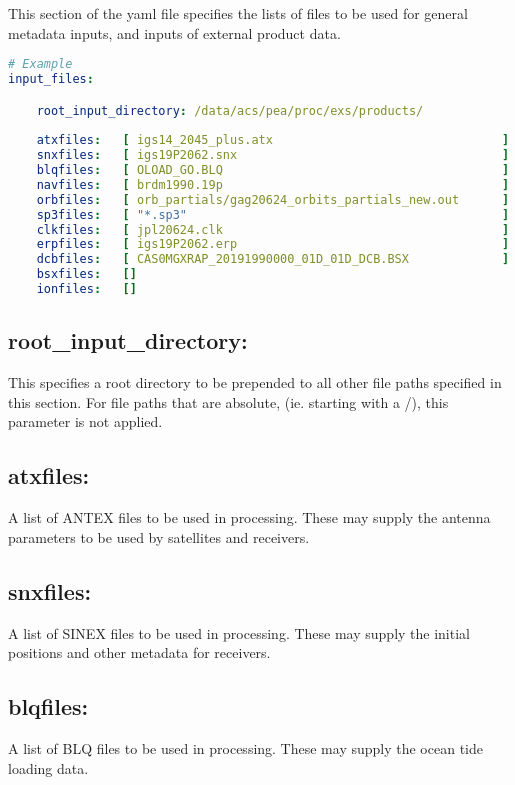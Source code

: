 This section of the yaml file specifies the lists of files to be used for general metadata inputs, and inputs of external product data.

\begin{lstlisting}[language=yaml,caption=A typical input\_files section]
# Example
input_files:

	root_input_directory: /data/acs/pea/proc/exs/products/
	
	atxfiles:   [ igs14_2045_plus.atx                                ]
	snxfiles:   [ igs19P2062.snx                                     ]
	blqfiles:   [ OLOAD_GO.BLQ                                       ]  
	navfiles:   [ brdm1990.19p                                       ]  
	orbfiles:   [ orb_partials/gag20624_orbits_partials_new.out      ]  
	sp3files:   [ "*.sp3"                                            ]
	clkfiles:   [ jpl20624.clk                                       ]  
	erpfiles:   [ igs19P2062.erp                                     ]  
	dcbfiles:   [ CAS0MGXRAP_20191990000_01D_01D_DCB.BSX             ] 
	bsxfiles:   []
	ionfiles:   [] 
\end{lstlisting}

\subsection*{root\_input\_directory:}
This specifies a root directory to be prepended to all other file paths specified in this section. For file paths that are absolute, (ie. starting with a /), this parameter is not applied.

\subsection*{atxfiles:}
A list of ANTEX files to be used in processing. These may supply the antenna parameters to be used by satellites and receivers.

\subsection*{snxfiles:}
A list of SINEX files to be used in processing. These may supply the initial positions and other metadata for receivers.

\subsection*{blqfiles:}
A list of BLQ files to be used in processing. These may supply the ocean tide loading data.


